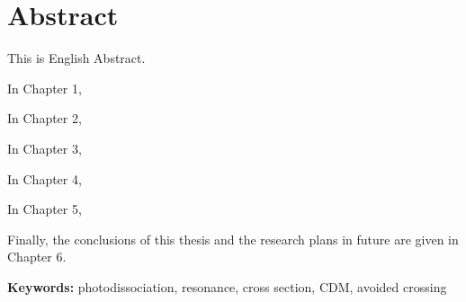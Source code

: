 \chapter{Abstract}


This is English Abstract.

In Chapter 1, 

In Chapter 2, 

In Chapter 3, 

In Chapter 4, 

In Chapter 5, 

Finally, the conclusions of this thesis and the research plans in future are given in Chapter 6.


\textbf{Keywords: } photodissociation, resonance, cross section, CDM, avoided crossing




\clearpage
\thispagestyle{plain}




